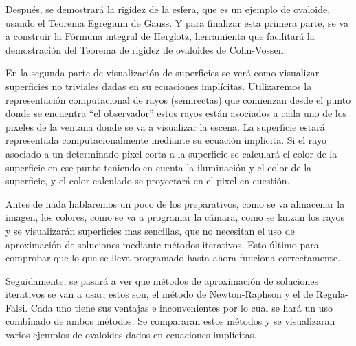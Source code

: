 Después, se demostrará la rigidez de la esfera, que es un ejemplo de ovaloide, usando el Teorema Egregium de Gauss. Y para finalizar esta primera parte, se va a construir la Fórmuna integral de Herglotz, herramienta que facilitará la demostración del Teorema de rigidez de ovaloides de Cohn-Vossen.

En la segunda parte de visualización de superficies se verá como visualizar superficies no triviales dadas en su ecuaciones implícitas. Utilizaremos la representación computacional de rayos (semirectas) que comienzan desde el punto donde se encuentra “el observador” estos rayos están asociados a cada uno de los pixeles de la ventana donde se va a visualizar la escena. La superficie estará representada computacionalmente mediante su ecuación implicita. Si el rayo asociado a un determinado pixel corta a la superficie se calculará el color de la superficie en ese punto teniendo en cuenta la iluminación y el color de la superficie, y el color calculado se proyectará en el pixel en cuestión.

Antes de nada hablaremos un poco de los preparativos, como se va almacenar la imagen, los colores, como se va a programar la cámara, como se lanzan los rayos y se visualizarán superficies mas sencillas, que no necesitan el uso de aproximación de soluciones mediante métodos iterativos. Esto último para comprobar que lo que se lleva programado hasta ahora funciona correctamente.

Seguidamente, se pasará a ver que métodos de aproximación de soluciones iterativos se van a usar, estos son, el método de Newton-Raphson y el de Regula-Falsi. Cada uno tiene sus ventajas e inconvenientes por lo cual se hará un uso combinado de ambos métodos. Se compararan estos métodos y se visualizaran varios ejemplos de ovaloides dados en ecuaciones implícitas.








\vspace{0.7cm}
\\

\chapter*{}
\thispagestyle{empty}

